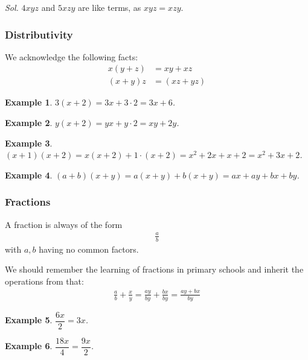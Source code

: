 \documentclass[12pt]{article}
\newtheorem{example}{Example}
\begin{document}
    \textit{ Sol.} $4xyz$ and $5xzy$ are like terms, as $xyz=xzy$.

    \subsubsection*{Distributivity}
    We acknowledge the following facts:\begin{align*}
        x(y+z)&=xy+xz\\
        (x+y)z&=(xz+yz)
    \end{align*}

    \begin{example}
        $3(x+2)=3x+3\cdot 2=3x+6$.
    \end{example}
    
    \begin{example}
        $y(x+2)=yx+y\cdot 2=xy+2y$.
    \end{example}
    
    \begin{example}
        $(x+1)(x+2)=x(x+2)+1\cdot (x+2)=x^2+2x+x+2=x^2+3x+2$.
    \end{example}
    
    \begin{example}
        $(a+b)(x+y)=a(x+y)+b(x+y)=ax+ay+bx+by$.
    \end{example}

    \subsubsection*{Fractions}

    A fraction is always of the form \begin{align*}
        \frac{a}{b}
    \end{align*} with $a,b$ having no common factors.

    We should remember the learning of fractions in primary schools and inherit the operations from that:\begin{align*}
        \frac{a}{b}+\frac{x}{y}=\frac{ay}{by}+\frac{bx}{by}=\frac{ay+bx}{by}
    \end{align*}

    \begin{example}
        $\dfrac{6x}{2}=3x$.
    \end{example}

    \begin{example}
        $\dfrac{18x}{4}=\dfrac{9x}{2}$.
    \end{example}
\end{document}
